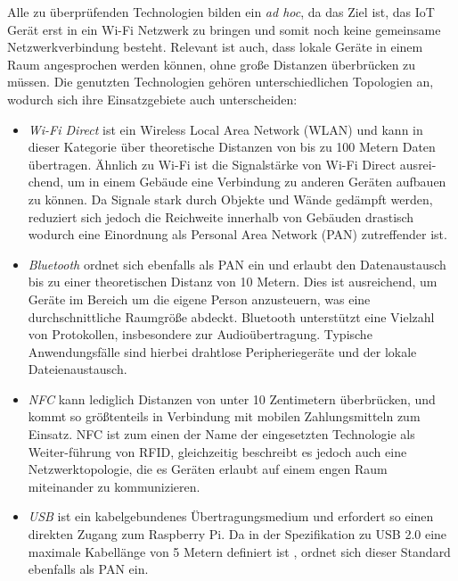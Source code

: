     Alle zu überprüfenden Technologien bilden ein {\it ad hoc}, da das Ziel ist, das IoT Gerät erst in ein Wi-Fi Netzwerk zu bringen und somit noch keine gemeinsame Netzwerkverbindung besteht. Relevant ist auch, dass lokale Geräte in einem Raum angesprochen werden können, ohne große Distanzen überbrücken zu müssen. Die genutzten Technologien gehören unterschiedlichen Topologien an, wodurch sich ihre Einsatzgebiete auch unterscheiden:
    \begin{itemize}
    \item {\it Wi-Fi Direct} ist ein Wireless Local Area Network (WLAN) und kann in dieser Kategorie über theoretische Distanzen von bis zu 100 Metern Daten übertragen. Ähnlich zu Wi-Fi ist die Signalstärke von Wi-Fi Direct ausrei-chend, um in einem Gebäude eine Verbindung zu anderen Geräten aufbauen zu können. Da Signale stark durch Objekte und Wände gedämpft werden, reduziert sich jedoch die Reichweite innerhalb von Gebäuden drastisch wodurch eine Einordnung als Personal Area Network (PAN) zutreffender ist.
    
    \item {\it Bluetooth} ordnet sich ebenfalls als PAN ein und erlaubt den Datenaustausch bis zu einer theoretischen Distanz von 10 Metern. Dies ist ausreichend, um Geräte im Bereich um die eigene Person anzusteuern, was eine durchschnittliche Raumgröße abdeckt. Bluetooth unterstützt eine Vielzahl von Protokollen, insbesondere zur Audioübertragung. Typische Anwendungsfälle sind hierbei drahtlose Peripheriegeräte und der lokale Dateienaustausch.
    
    \item {\it NFC} kann lediglich Distanzen von unter 10 Zentimetern überbrücken, und kommt so größtenteils in Verbindung mit mobilen Zahlungsmitteln zum Einsatz. NFC ist zum einen der Name der eingesetzten Technologie als Weiter-führung von RFID, gleichzeitig beschreibt es jedoch auch eine Netzwerktopologie, die es Geräten erlaubt auf einem engen Raum miteinander zu kommunizieren. 
    
    \item {\it USB} ist ein kabelgebundenes Übertragungsmedium und erfordert so einen direkten Zugang zum Raspberry Pi. Da in der Spezifikation zu USB 2.0 eine maximale Kabellänge von 5 Metern definiert ist \cite{usbSpec}, ordnet sich dieser Standard ebenfalls als PAN ein.
    
    \end{itemize}